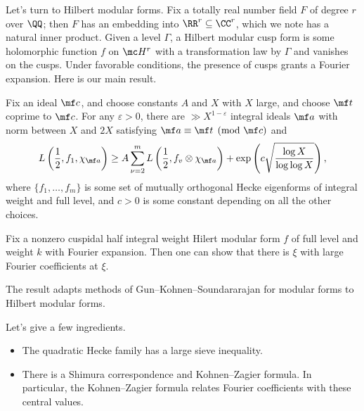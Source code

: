 \documentclass{article}
\begin{document}
Let's turn to Hilbert modular forms. Fix a totally real number field $F$ of degree $r$ over $\QQ$; then $F$ has an embedding into $\RR^r\subseteq\CC^r$, which we note has a natural inner product. Given a level $\Gamma$, a Hilbert modular cusp form is some holomorphic function $f$ on $\mc H^r$ with a transformation law by $\Gamma$ and vanishes on the cusps. Under favorable conditions, the presence of cusps grants a Fourier expansion. Here is our main result.
\begin{theorem}
	Fix an ideal $\mf c$, and choose constants $A$ and $X$ with $X$ large, and choose $\mf t$ coprime to $\mf c$. For any $\varepsilon>0$, there are $\gg X^{1-\varepsilon}$ integral ideals $\mf a$ with norm between $X$ and $2X$ satisfying $\mf a\equiv\mf t\pmod{\mf c}$ and
	\[L\left(\frac12,f_1,\chi_{\mf a}\right)\ge A\sum_{\nu=2}^mL\left(\frac12,f_v\otimes\chi_{\mf a}\right)+\exp\left(c\sqrt{\frac{\log X}{\log\log X}}\right),\]
	where $\{f_1,\ldots,f_m\}$ is some set of mutually orthogonal Hecke eigenforms of integral weight and full level, and $c>0$ is some constant depending on all the other choices.
\end{theorem}
\begin{theorem}
	Fix a nonzero cuspidal half integral weight Hilert modular form $f$ of full level and weight $k$ with Fourier expansion. Then one can show that there is $\xi$ with large Fourier coefficients at $\xi$.
\end{theorem}
\begin{remark}
	The result adapts methods of Gun--Kohnen--Soundararajan for modular forms to Hilbert modular forms.
\end{remark}
\begin{remark}
	Let's give a few ingredients.
	\begin{itemize}
		\item The quadratic Hecke family has a large sieve inequality.
		\item There is a Shimura correspondence and Kohnen--Zagier formula. In particular, the Kohnen--Zagier formula relates Fourier coefficients with these central values.
	\end{itemize}
\end{remark}
\end{document}
